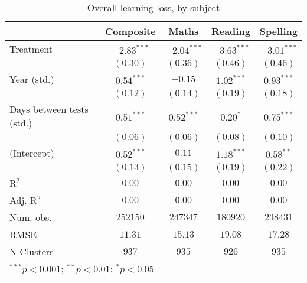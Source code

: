 
\begin{table}
\begin{center}
\begin{tabular}{l c c c c}
\hline
 & Composite & Maths & Reading & Spelling \\
\hline
Treatment                 & $-2.83^{***}$ & $-2.04^{***}$ & $-3.63^{***}$ & $-3.01^{***}$ \\
                          & $(0.30)$      & $(0.36)$      & $(0.46)$      & $(0.46)$      \\
Year (std.)               & $0.54^{***}$  & $-0.15$       & $1.02^{***}$  & $0.93^{***}$  \\
                          & $(0.12)$      & $(0.14)$      & $(0.19)$      & $(0.18)$      \\
Days between tests (std.) & $0.51^{***}$  & $0.52^{***}$  & $0.20^{*}$    & $0.75^{***}$  \\
                          & $(0.06)$      & $(0.06)$      & $(0.08)$      & $(0.10)$      \\
(Intercept)               & $0.52^{***}$  & $0.11$        & $1.18^{***}$  & $0.58^{**}$   \\
                          & $(0.13)$      & $(0.15)$      & $(0.19)$      & $(0.22)$      \\
\hline
R$^2$                     & $0.00$        & $0.00$        & $0.00$        & $0.00$        \\
Adj. R$^2$                & $0.00$        & $0.00$        & $0.00$        & $0.00$        \\
Num. obs.                 & $252150$      & $247347$      & $180920$      & $238431$      \\
RMSE                      & $11.31$       & $15.13$       & $19.08$       & $17.28$       \\
N Clusters                & $937$         & $935$         & $926$         & $935$         \\
\hline
\multicolumn{5}{l}{\scriptsize{$^{***}p<0.001$; $^{**}p<0.01$; $^{*}p<0.05$}}
\end{tabular}
\caption{Overall learning loss, by subject}
\label{table:overall}
\end{center}
\end{table}
